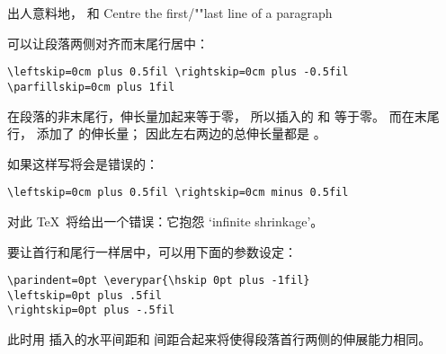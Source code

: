 \documentclass{book}
\begin{document}
出人意料地， 和 
\mdqon
\howto Centre the first/""last line of a paragraph\par
\mdqoff
可以让段落两侧对齐而末尾行居中：
\begin{verbatim}
\leftskip=0cm plus 0.5fil \rightskip=0cm plus -0.5fil
\parfillskip=0cm plus 1fil
\end{verbatim}
在段落的非末尾行，伸长量加起来等于零，
所以插入的  和  等于零。
而在末尾行， 添加了 \hbox{} 的伸长量；
因此左右两边的总伸长量都是 \hbox{}。

如果这样写将会是错误的：
\begin{verbatim}
\leftskip=0cm plus 0.5fil \rightskip=0cm minus 0.5fil
\end{verbatim}
对此 \TeX\ 将给出一个错误：它抱怨 `infinite shrinkage'。

要让首行和尾行一样居中，可以用下面的参数设定：
\begin{verbatim}
\parindent=0pt \everypar{\hskip 0pt plus -1fil}
\leftskip=0pt plus .5fil
\rightskip=0pt plus -.5fil
\end{verbatim}
此时用  插入的水平间距和 
间距合起来将使得段落首行两侧的伸展能力相同。
\end{document}
